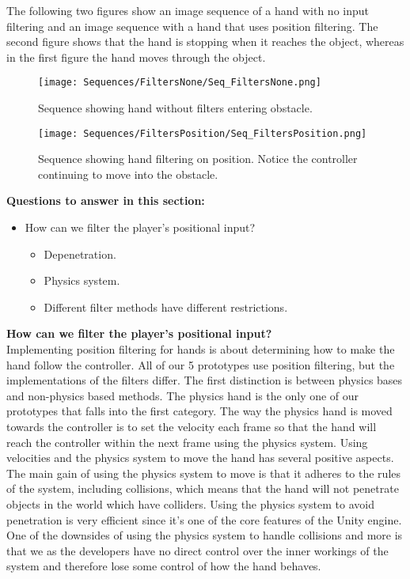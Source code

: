 The following two figures show an image sequence of a hand with no input filtering and an image sequence with a hand that uses position filtering. The second figure shows that the hand is stopping when it reaches the object, whereas in the first figure the hand moves through the object.

\begin{figure}[H]
\label{fig:filtersNone}
\centering
\texttt{[image: Sequences/FiltersNone/Seq\_FiltersNone.png]}
\caption{Sequence showing hand without filters entering obstacle.}
\end{figure}

\begin{figure}[H]
\label{fig:filtersPosition}
\centering
\texttt{[image: Sequences/FiltersPosition/Seq\_FiltersPosition.png]}
\caption{Sequence showing hand filtering on position. Notice the controller continuing to move into the obstacle.}
\end{figure}

\textbf{Questions to answer in this section:}
\begin{itemize}
\item How can we filter the player's positional input?
\begin{itemize}
\item Depenetration.
\item Physics system.
\item Different filter methods have different restrictions.
\end{itemize}
\end{itemize}

\textbf{How can we filter the player's positional input?}\\
Implementing position filtering for hands is about determining how to make the hand follow the controller. All of our 5 prototypes use position filtering, but the implementations of the filters differ. The first distinction is between physics bases and non-physics based methods. The physics hand is the only one of our prototypes that falls into the first category. The way the physics hand is moved towards the controller is to set the velocity each frame so that the hand will reach the controller within the next frame using the physics system. Using velocities and the physics system to move the hand has several positive aspects. The main gain of using the physics system to move is that it adheres to the rules of the system, including collisions, which means that the hand will not penetrate objects in the world which have colliders. Using the physics system to avoid penetration is very efficient since it's one of the core features of the Unity engine. One of the downsides of using the physics system to handle collisions and more is that we as the developers have no direct control over the inner workings of the system and therefore lose some control of how the hand behaves.

